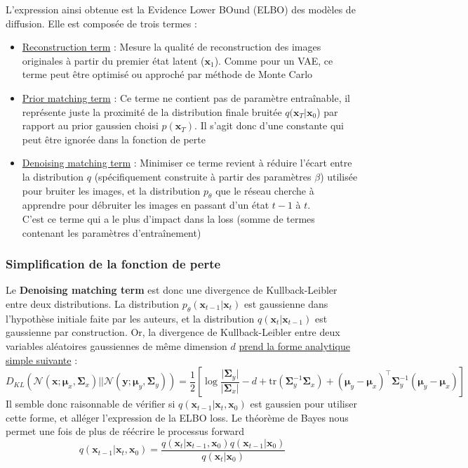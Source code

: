\documentclass{article}
\begin{document}
L'expression ainsi obtenue est la Evidence Lower BOund (ELBO) des modèles de diffusion. Elle est composée de trois termes :
\begin{itemize}
    \item  \underline{Reconstruction term} : Mesure la qualité de reconstruction des images originales à partir du premier état latent ($\boldsymbol{x}_1$). Comme pour un VAE, ce terme peut être optimisé ou approché par méthode de Monte Carlo
    \item \underline{Prior matching term} : Ce terme ne contient pas de paramètre entraînable, il représente juste la proximité de la distribution finale bruitée $q(\boldsymbol{x}_T|\boldsymbol{x}_0$) par rapport au prior gaussien choisi $p(\boldsymbol{x}_T)$. Il s'agit donc d'une constante qui peut être ignorée dans la fonction de perte
    \item \underline{Denoising matching term} : Minimiser ce terme revient à réduire l'écart entre la distribution $q$ (spécifiquement construite à partir des paramètres $\beta$) utilisée pour bruiter les images, et la distribution $p_{\theta}$ que le réseau cherche à apprendre pour débruiter les images en passant d'un état $t-1$ à $t$. \\
    C'est ce terme qui a le plus d'impact dans la loss (somme de termes contenant les paramètres d'entraînement)
\end{itemize}

\subsubsection{Simplification de la fonction de perte}

Le \textbf{Denoising matching term} est donc une divergence de Kullback-Leibler entre deux distributions. La distribution $p_\theta(\textbf{x}_{t-1}|\textbf{x}_t)$ est gaussienne dans l'hypothèse initiale faite par les auteurs, et la distribution $q(\textbf{x}_{t}|\textbf{x}_{t-1})$ est gaussienne par construction. Or, la divergence de Kullback-Leibler entre deux variables aléatoires gaussiennes de même dimension $d$ \href{https://en.wikipedia.org/wiki/Kullback%E2%80%93Leibler_divergence#Multivariate_normal_distributions}{prend la forme analytique simple suivante} :
\large
$$ D_{KL} (\mathcal{N}(\boldsymbol{x};\boldsymbol{\mu}_x,\boldsymbol{\Sigma}_x)||\mathcal{N}(\boldsymbol{y};\boldsymbol{\mu}_y,\boldsymbol{\Sigma}_y)) = \frac{1}{2} [\log\frac{\lvert \boldsymbol{\Sigma}_y \rvert}{\lvert \boldsymbol{\Sigma}_x \rvert} - d + \text{tr}(\boldsymbol{\Sigma}_y^{-1} \boldsymbol{\Sigma}_x) + (\boldsymbol{\mu}_y - \boldsymbol{\mu}_x)^\intercal \boldsymbol{\Sigma}_y^{-1} (\boldsymbol{\mu}_y - \boldsymbol{\mu}_x)]$$
\normalsize
Il semble donc raisonnable de vérifier si $q(\boldsymbol{x}_{t-1}|\boldsymbol{x}_{t},\boldsymbol{x}_{0})$ est gaussien pour utiliser cette forme, et alléger l'expression de la ELBO loss. Le théorème de Bayes nous permet une fois de plus de réécrire le processus forward
$$ q(\boldsymbol{x}_{t-1}|\boldsymbol{x}_{t},\boldsymbol{x}_{0}) = \frac{q(\boldsymbol{x}_{t}|\boldsymbol{x}_{t-1},\boldsymbol{x}_{0})q(\boldsymbol{x}_{t-1}|\boldsymbol{x}_{0})}{q(\boldsymbol{x}_{t}|\boldsymbol{x}_{0})} $$
\end{document}
